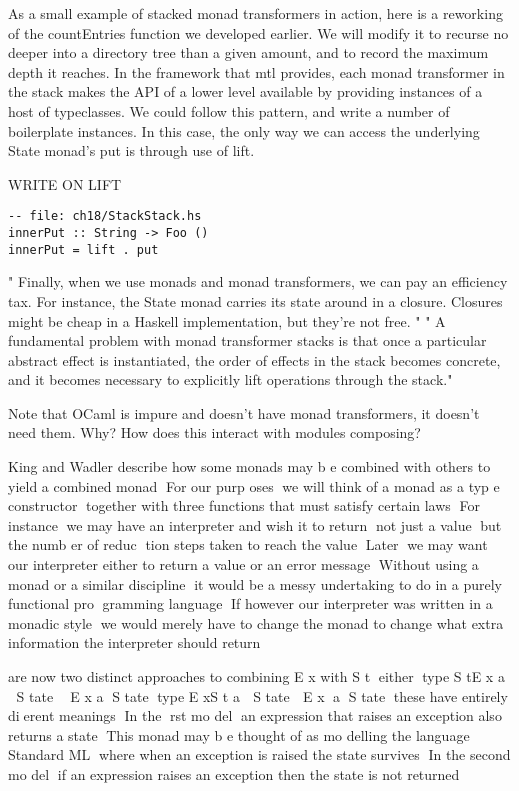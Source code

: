 As a small example of stacked monad transformers in action, here is a reworking of the countEntries function we developed earlier. We will modify it to recurse no deeper into a directory tree than a given amount, and to record the maximum depth it reaches.
In the framework that mtl provides, each monad transformer in the stack makes the API of a lower level available by providing instances of a host of typeclasses. We could follow this pattern, and write a number of boilerplate instances.
In this case, the only way we can access the underlying State monad's put is through use of lift.

WRITE ON LIFT
\begin{verbatim}
-- file: ch18/StackStack.hs
innerPut :: String -> Foo ()
innerPut = lift . put
\end{verbatim}

"
Finally, when we use monads and monad transformers, we can pay an efficiency tax.
For instance, the State monad carries its state around in a closure.
Closures might be cheap in a Haskell implementation, but they're not free.
"
\cite{o2008real}
"
A fundamental problem with monad transformer stacks is that
once a particular abstract effect is instantiated,
the order of effects in the stack becomes concrete,
and it becomes necessary to explicitly lift operations
through the stack."
\cite{kammar2013handlers}








Note that OCaml is impure and doesn't have monad transformers,
it doesn't need them.
Why?
How does this interact with modules composing?



King and Wadler \cite{king1993combining}
describe how some monads may b e combined with others to yield a combined monad􏰀
For our purp oses􏰂 we will think of a monad as a typ e constructor􏰂 together with three functions that must satisfy certain laws􏰀 For instance􏰂 we may have an interpreter and wish it to return􏰂 not just a value􏰂 but the numb er of reduc􏰉 tion steps taken to reach the value􏰀 Later􏰂 we may want our interpreter either to return a value or an error message􏰀 Without using a monad or a similar discipline􏰂 it would be a messy undertaking to do in a purely functional pro􏰉 gramming language􏰀 If however our interpreter was written in a monadic style􏰂 we would merely have to change the monad to change what extra information the interpreter should return􏰀


are now two distinct approaches to combining E x with S t􏰂 either􏰊
type S tE x a 􏰏 S tate 􏰝 􏰌E x a􏰚 S tate􏰎
type E xS t a 􏰏 S tate 􏰝 E x 􏰌a􏰚 S tate􏰎
these have entirely di􏰓erent meanings􏰀 In the 􏰁rst mo del􏰂 an expression that raises an exception also returns a state􏰀 This monad may b e thought of as mo delling the language Standard ML􏰂 where when an exception is raised the state survives􏰀 In the second mo del􏰂 if an expression raises an exception then
the
state is not returned􏰀

